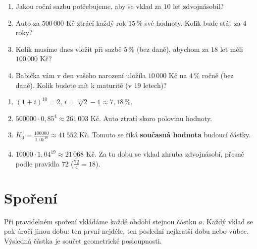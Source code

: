 \begin{problem}
  \begin{enumerate}[label=(\alph*)]
    \item Jakou roční sazbu potřebujeme, aby se vklad za $10$ let zdvojnásobil?
    \item Auto za $500\,000$ Kč ztrácí každý rok $15\,\%$ své hodnoty. Kolik bude stát za $4$ roky?
    \item Kolik musíme dnes vložit při sazbě $5\,\%$ (bez daně), abychom za $18$ let měli $100\,000$ Kč?
    \item Babička vám v den vašeho narození uložila $10\,000$ Kč na $4\,\%$ ročně (bez daně). Kolik budete mít k maturitě (v $19$ letech)?
  \end{enumerate}
\end{problem}

\begin{solution}
  \begin{enumerate}[label=(\alph*)]
    \item ${(1 + i)}^{10} = 2$, $i = \sqrt[10]{2} - 1\approx 7{,}18\,\%$.
    \item $500000\cdot 0{,}85^4\approx 261\,003$ Kč. Auto ztratí skoro polovinu hodnoty.
    \item $K_0 = \frac{100000}{1{,}05^{18}}\approx 41\,552$ Kč. Tomuto se říká \textbf{současná hodnota} budoucí částky.
    \item $10000\cdot 1{,}04^{19}\approx 21\,068$ Kč. Za tu dobu se vklad zhruba zdvojnásobí, přesně podle pravidla 72 ($\frac{72}{4} = 18$).
  \end{enumerate}
\end{solution}

\section{Spoření}\label{sec:sporeni}

Při pravidelném spoření vkládáme každé období stejnou částku $a$. Každý vklad se pak úročí jinou dobu: ten první nejdéle, ten poslední nejkratší dobu nebo vůbec. Výsledná částka je součet geometrické posloupnosti.

